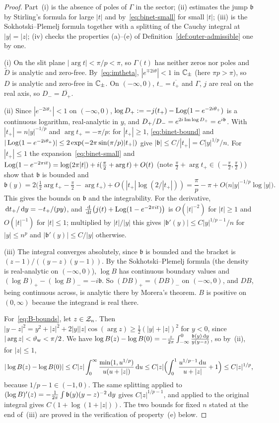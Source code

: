 \begin{proof}
Part~(i) is the absence of poles of $\Gamma$ in the sector; (ii) estimates the jump $\mathfrak b$ by Stirling's formula
for large $|t|$ and by~\eqref{eq:binet-small} for small $|t|$; (iii) is the Sokhotski--Plemelj formula together with a
splitting of the Cauchy integral at $|y|=|z|$; (iv) checks the properties (a)--(e) of
Definition~\ref{def:outer-admissible} one by one.

(i) On the slit plane $|\arg t|<\pi/p<\pi$, so $\Gamma(t)$ has neither zeros nor poles and $\tilde D$ is analytic and
zero-free. By~\eqref{eq:imtheta}, $|e^{\mp2i\theta}|<1$ in $\mathbb{C}_\pm$ (here $\pi p>\pi$), so $D$ is analytic and
zero-free in $\mathbb{C}_\pm$. On $(-\infty,0)$, $t_-=\overline{t_+}$ and $\Gamma$, $j$ are real on the real axis, so
$D_-=\overline{D_+}$.

(ii) Since $|e^{-2i\theta_+}|<1$ on $(-\infty,0)$, $\log D_+:=-j(t_+)-\operatorname{Log}(1-e^{-2i\theta_+})$ is a continuous
logarithm, real-analytic in $y$, and $D_+/D_-=e^{2i\operatorname{Im}\log D_+}=e^{i\mathfrak b}$. With $|t_+|=n|y|^{-1/p}$ and
$\arg t_+=-\pi/p$: for $|t_+|\ge1$, \eqref{eq:binet-bound} and
$|\operatorname{Log}(1-e^{-2i\theta_+})|\le2\exp(-2\pi\sin(\pi/p)|t_+|)$ give $|\mathfrak b|\le C/|t_+|=C|y|^{1/p}/n$. For $|t_+|\le1$
the expansion~\eqref{eq:binet-small} and $\operatorname{Log}(1-e^{-2\pi it})=\log(2\pi|t|)+i(\frac\pi2+\arg t)+O(t)$ (note
$\frac\pi2+\arg t_+\in(-\frac\pi2,\frac\pi2)$) show that $\mathfrak b$ is bounded and
\[
  \mathfrak b(y)=2\bigl(\tfrac12\arg t_+-\tfrac\pi2-\arg t_+\bigr)+O(|t_+|\log(2/|t_+|))=\frac\pi p-\pi+O\bigl(n|y|^{-1/p}\log|y|\bigr).
\]
This gives the bounds on $\mathfrak b$ and the integrability. For the derivative, $\,\mathrm{d} t_+/\,\mathrm{d} y=-t_+/(py)$, and
$\frac{\,\mathrm{d}}{\,\mathrm{d} t}\bigl(j(t)+\operatorname{Log}(1-e^{-2\pi it})\bigr)$ is $O(|t|^{-2})$ for $|t|\ge1$ and $O(|t|^{-1})$ for
$|t|\le1$; multiplied by $|t|/|y|$ this gives $|\mathfrak b'(y)|\le C|y|^{1/p-1}/n$ for $|y|\le n^p$ and
$|\mathfrak b'(y)|\le C/|y|$ otherwise.

(iii) The integral converges absolutely, since $\mathfrak b$ is bounded and the bracket is $(z-1)/((y-z)(y-1))$. By the
Sokhotski--Plemelj formula (the density is real-analytic on $(-\infty,0)$), $\log B$ has continuous boundary values
and $(\log B)_+-(\log B)_-=-i\mathfrak b$. So $(DB)_+=(DB)_-$ on $(-\infty,0)$, and $DB$, being continuous across, is
analytic there by Morera's theorem. $B$ is positive on $(0,\infty)$ because the integrand is real there.

For~\eqref{eq:B-bounds}, let $z\in\mathcal{Z}_n$. Then $|y-z|^2=y^2+|z|^2+2|y||z|\cos(\arg z)\ge\frac12(|y|+|z|)^2$ for $y<0$,
since $|\arg z|<\vartheta_{\mathrm{w}}<\pi/2$. We have $\log B(z)-\log B(0)=-\frac z{2\pi}\int_{-\infty}^0\frac{\mathfrak b(y)\,\mathrm{d} y}{y(y-z)}$, so
by~(ii), for $|z|\le1$,
\[
  |\log B(z)-\log B(0)|\le C|z|\int_0^\infty\frac{\min(1,u^{1/p})}{u(u+|z|)}\,\mathrm{d} u\le
  C|z|\Bigl(\int_0^1\frac{u^{1/p-1}\,\mathrm{d} u}{u+|z|}+1\Bigr)\le C|z|^{1/p},
\]
because $1/p-1\in(-1,0)$. The same splitting applied to $(\log B)'(z)=-\frac1{2\pi}\int\mathfrak b(y)(y-z)^{-2}\,\mathrm{d} y$
gives $C|z|^{1/p-1}$, and applied to the original integral gives $C(1+\log(1+|z|))$. The two bounds for fixed $n$
stated at the end of~(iii) are proved in the verification of property~(e) below.


\end{proof}
